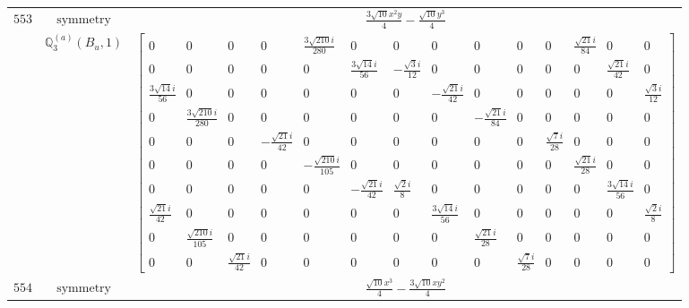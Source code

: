 \documentclass[fleqn,8pt,landscape]{jsarticle}
\begin{document}
\begin{longtable}{ccc}
$ 553 $ & $ \text{symmetry} $ & $ \frac{3 \sqrt{10} x^{2} y}{4} - \frac{\sqrt{10} y^{3}}{4} $ \\
$  $ & $ \mathbb{Q}_{3}^{(a)}(B_{u},1) $ & $ \begin{bmatrix} 0 & 0 & 0 & 0 & \frac{3 \sqrt{210} i}{280} & 0 & 0 & 0 & 0 & 0 & 0 & \frac{\sqrt{21} i}{84} & 0 & 0 \\ 0 & 0 & 0 & 0 & 0 & \frac{3 \sqrt{14} i}{56} & - \frac{\sqrt{3} i}{12} & 0 & 0 & 0 & 0 & 0 & \frac{\sqrt{21} i}{42} & 0 \\ \frac{3 \sqrt{14} i}{56} & 0 & 0 & 0 & 0 & 0 & 0 & - \frac{\sqrt{21} i}{42} & 0 & 0 & 0 & 0 & 0 & \frac{\sqrt{3} i}{12} \\ 0 & \frac{3 \sqrt{210} i}{280} & 0 & 0 & 0 & 0 & 0 & 0 & - \frac{\sqrt{21} i}{84} & 0 & 0 & 0 & 0 & 0 \\ 0 & 0 & 0 & - \frac{\sqrt{21} i}{42} & 0 & 0 & 0 & 0 & 0 & 0 & \frac{\sqrt{7} i}{28} & 0 & 0 & 0 \\ 0 & 0 & 0 & 0 & - \frac{\sqrt{210} i}{105} & 0 & 0 & 0 & 0 & 0 & 0 & \frac{\sqrt{21} i}{28} & 0 & 0 \\ 0 & 0 & 0 & 0 & 0 & - \frac{\sqrt{21} i}{42} & \frac{\sqrt{2} i}{8} & 0 & 0 & 0 & 0 & 0 & \frac{3 \sqrt{14} i}{56} & 0 \\ \frac{\sqrt{21} i}{42} & 0 & 0 & 0 & 0 & 0 & 0 & \frac{3 \sqrt{14} i}{56} & 0 & 0 & 0 & 0 & 0 & \frac{\sqrt{2} i}{8} \\ 0 & \frac{\sqrt{210} i}{105} & 0 & 0 & 0 & 0 & 0 & 0 & \frac{\sqrt{21} i}{28} & 0 & 0 & 0 & 0 & 0 \\ 0 & 0 & \frac{\sqrt{21} i}{42} & 0 & 0 & 0 & 0 & 0 & 0 & \frac{\sqrt{7} i}{28} & 0 & 0 & 0 & 0 \end{bmatrix} $ \\ \hline
$ 554 $ & $ \text{symmetry} $ & $ \frac{\sqrt{10} x^{3}}{4} - \frac{3 \sqrt{10} x y^{2}}{4} $ \\

\end{longtable}
\end{document}
